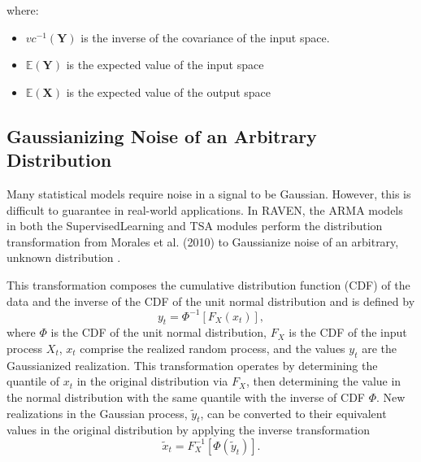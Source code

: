where:
\begin{itemize}
  \item $vc^{-1}(\boldsymbol{Y})$ is the inverse of the covariance of the
  input space.
  \item $\mathbb{E}(\boldsymbol{Y})$ is the expected value of the input space
  \item $\mathbb{E}(\boldsymbol{X})$ is the expected value of the output space
\end{itemize}

\subsection{Gaussianizing Noise of an Arbitrary Distribution}
Many statistical models require noise in a signal to be Gaussian.
However, this is difficult to guarantee in real-world applications.
In RAVEN, the ARMA models in both the SupervisedLearning and TSA modules perform the distribution transformation from Morales et al. (2010) to Gaussianize noise of an arbitrary, unknown distribution \cite{morales_methodology_2010}.

This transformation composes the cumulative distribution function (CDF) of the data and the inverse of the CDF of the unit normal distribution and is defined by
\begin{equation} \label{eq:gaussianizing_transform}
	y_t = \Phi^{-1}\left[F_X\left(x_t\right)\right],
\end{equation}
where $\Phi$ is the CDF of the unit normal distribution, $F_X$ is the CDF of the input process $X_t$, $x_t$ comprise the realized random process, and the values $y_t$ are the Gaussianized realization.
This transformation operates by determining the quantile of $x_t$ in the original distribution via $F_X$, then determining the value in the normal distribution with the same quantile with the inverse of CDF $\Phi$.
New realizations in the Gaussian process, $\tilde{y}_t$, can be converted to their equivalent values in the original distribution by applying the inverse transformation
\begin{equation} \label{eq:gauss_inverse_transform}
	\tilde{x}_t = F_X^{-1}\left[\Phi\left(\tilde{y}_t\right)\right].
\end{equation}

